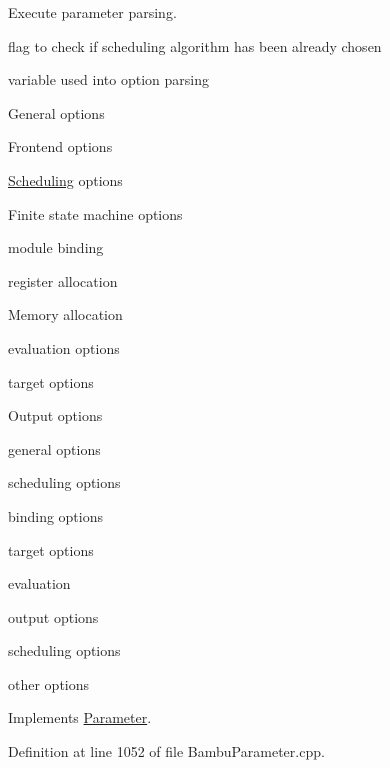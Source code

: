 Execute parameter parsing. 

flag to check if scheduling algorithm has been already chosen

variable used into option parsing

General options

Frontend options

\hyperlink{classScheduling}{Scheduling} options

Finite state machine options

module binding

register allocation

Memory allocation

evaluation options

target options

Output options

general options

scheduling options

binding options

target options

evaluation

output options

scheduling options

other options 

Implements \hyperlink{classParameter_a9f5cc51b6e9ac1e01fe1c5a6362c030b}{Parameter}.



Definition at line 1052 of file Bambu\+Parameter.\+cpp.



